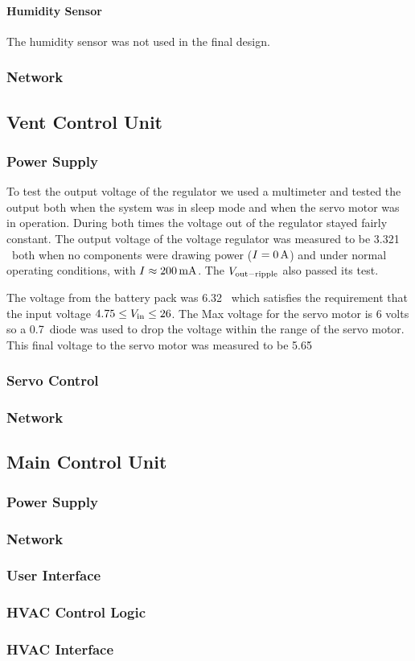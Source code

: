 \paragraph{Humidity Sensor}
The humidity sensor was not used in the final design.

\subsubsection{Network}

\subsection{Vent Control Unit}
\subsubsection{Power Supply}
To test the output voltage of the regulator we used a multimeter and tested the output both when the system was in sleep mode and when the servo motor was in operation. During both times the voltage out of the regulator stayed fairly constant. The output voltage of the voltage regulator was measured to be 3.321 \volts\ both when no components were drawing power ($I=0\mbox{\,A}$) and under normal operating conditions, with $I\approx200\mbox{\,mA}$. The $V_{\rm out-ripple}$ also passed its test.

The voltage from the battery pack was 6.32  \volts\, which satisfies the requirement that the input voltage $4.75 \leq V_{\rm in} \leq 26$. The Max voltage for the servo motor is 6 volts so a 0.7\volt\ diode was used to drop the voltage within the range of the servo motor. This final voltage to the servo motor was measured to be 5.65\volts\.

\subsubsection{Servo Control}

\subsubsection{Network}

\subsection{Main Control Unit}

\subsubsection{Power Supply}

\subsubsection{Network}

\subsubsection{User Interface}

\subsubsection{HVAC Control Logic}

\subsubsection{HVAC Interface}


